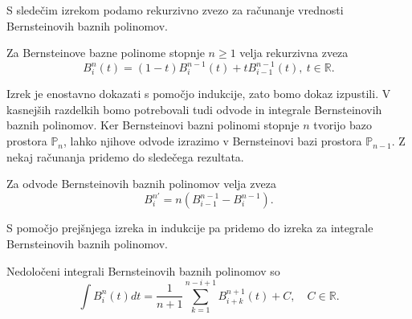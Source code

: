 \documentclass[isrm2, tisk]{fmfdelo}
\newcommand{\R}{\mathbb R}
\begin{document}
    S sledečim izrekom podamo rekurzivno zvezo za računanje vrednosti Bernsteinovih baznih polinomov.
    \begin{izrek}
        \label{izrek:bernsteinovi_lastnosti:rekruzija}
        Za Bernsteinove bazne polinome stopnje $n\geq1$ velja rekurzivna zveza
        \[B_i^n(t) = (1-t)B_i^{n-1}(t) + tB_{i-1}^{n-1}(t),\ t\in\R.\]
    \end{izrek}
    \noindent Izrek je enostavno dokazati s pomočjo indukcije, zato bomo dokaz izpustili.
    V kasnejših razdelkih bomo potrebovali tudi odvode in integrale Bernsteinovih baznih polinomov.
    Ker Bernsteinovi bazni polinomi stopnje $n$ tvorijo bazo prostora $\mathbb{P}_n$, lahko njihove odvode izrazimo v Bernsteinovi bazi prostora $\mathbb{P}_{n-1}$.
    Z nekaj računanja pridemo do sledečega rezultata.
    \begin{izrek}
        \label{izrek:bernstein-odvod}
        Za odvode Bernsteinovih baznih polinomov velja zveza
        \[B_{i}^{n\prime}=n(B_{i-1}^{n-1} - B_{i}^{n-1}).\]
    \end{izrek}
    \noindent S pomočjo prejšnjega izreka in indukcije pa pridemo do izreka za integrale Bernsteinovih baznih polinomov.
    \begin{izrek}
        \label{izrek:bernstein-integral}
        Nedoločeni integrali Bernsteinovih baznih polinomov so
        \[\int B_{i}^{n}(t)dt= \frac{1}{n+1} \sum_{k=1}^{n-i+1}  B_{i+k}^{n+1}(t) + C,\quad C\in\R. \]
    \end{izrek}
\end{document}
